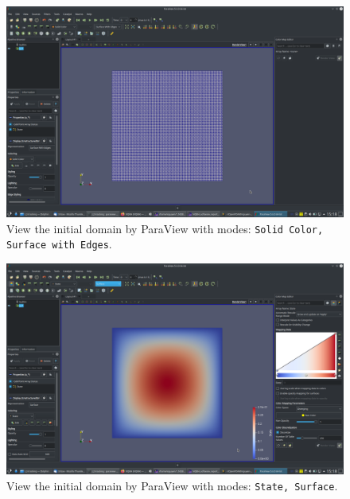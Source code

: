 \documentclass[onsided]{book}
\numberwithin{equation}{section}
\begin{document}
\begin{enumerate}
\begin{enumerate}
        \begin{figure}[H]
            \centering
            \includegraphics[height=0.44\textheight]{L2-tracking_initial_domain_Solid_Color_Surface_with_Edges}
            \caption{View the initial domain by ParaView with modes: \texttt{Solid Color, Surface with Edges}.}
        \end{figure}
    
        \begin{figure}[H]
            \centering
            \includegraphics[height=0.44\textheight]{L2-tracking_initial_domain_State_Surface}
            \caption{View the initial domain by ParaView with modes: \texttt{State, Surface}.}
        \end{figure}
        

\end{enumerate}
\end{enumerate}
\end{document}
